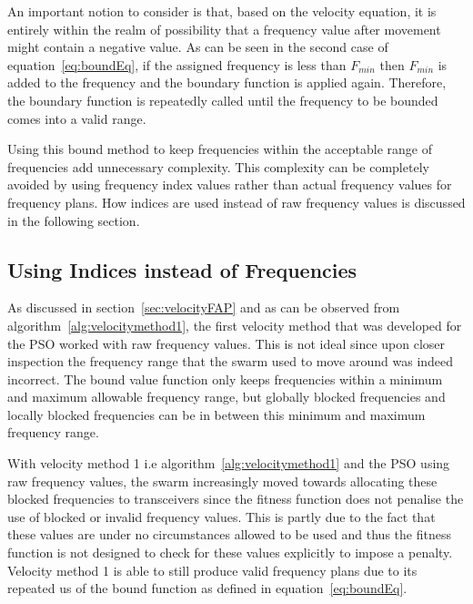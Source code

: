 An important notion to consider is that, based on the velocity equation, it is entirely within the realm of possibility that a frequency value after movement might contain a negative value. As can be seen in the second case of equation~\ref{eq:boundEq}, if the assigned frequency is less than $F_{min}$ then $F_{min}$ is added to the frequency and the boundary function is applied again. Therefore, the boundary function is repeatedly called until the frequency to be bounded comes into a valid range.

Using this bound method to keep frequencies within the acceptable range of frequencies add unnecessary complexity. This complexity can be completely avoided by using frequency index values rather than actual frequency values for frequency plans. How indices are used instead of raw frequency values is discussed in the following section.
\subsection{Using Indices instead of Frequencies}
\label{sec:velocityFAP2}
As discussed in section~\ref{sec:velocityFAP} and as can be observed from algorithm~\ref{alg:velocitymethod1}, the first velocity method that was developed for the \gls{PSO} worked with raw frequency values. This is not ideal since upon closer inspection the frequency range that the swarm used to move around was indeed incorrect. The bound value function only keeps frequencies within a minimum and maximum allowable frequency range, but globally blocked frequencies and locally blocked frequencies can be in between this minimum and maximum frequency range. 

With velocity method 1 i.e algorithm~\ref{alg:velocitymethod1} and the \gls{PSO} using raw frequency values, the swarm increasingly moved towards allocating these blocked frequencies to transceivers since the fitness function does not penalise the use of blocked or invalid frequency values. This is partly due to the fact that these values are under no circumstances allowed to be used and thus the fitness function is not designed to check for these values explicitly to impose a penalty. Velocity method 1 is able to still produce valid frequency plans due to its repeated us of the bound function as defined in equation~\ref{eq:boundEq}.

